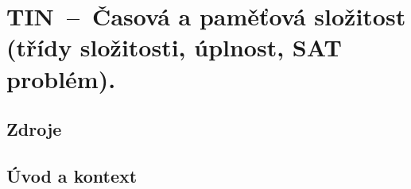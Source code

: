 

\graphicspath{{tin/slozitost/figures}}


\chapter{TIN~--~Časová a paměťová složitost (třídy složitosti, úplnost, SAT problém).}


\section{Zdroje}

\begin{compactitem}
    \item {}
    \item {}
\end{compactitem}


\section{Úvod a kontext}

